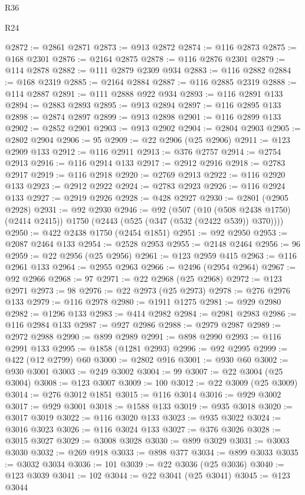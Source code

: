 \begin{lexlean}{R36}
\begin{lexlean}{R24}
\begin{coremodule}
{{{{{{{{{{{{{{{{{{{{{{{{{{{{{{{{{{{{{{{{{{{{{{{{{{{{{{{{{{{{{{{{{{{{{{{{{{{{{{{{{{{{{{{{{{{{{{{{{{{{{{{{{{{{{{{{{{{{{{{{{{{{{{{{{{{{{{{{{{{{{{{{{{{{{{{{{{{{{{{{{{{{{{{{{{{{{{{{{{{{{{{{{{{{{{{{{{{@2872 := @2861 @2871
@2873 := @913 @2872
@2874 := @116 @2873
@2875 := @168 @2301
@2876 := @2164 @2875
@2878 := @116 @2876 @2301
@2879 := @114 @2878
@2882 := @111 @2879 @2309 @934
@2883 := @116 @2882
@2884 := @168 @2319
@2885 := @2164 @2884
@2887 := @116 @2885 @2319
@2888 := @114 @2887
@2891 := @111 @2888 @922 @934
@2893 := @116 @2891 @133
@2894 := @2883 @2893
@2895 := @913 @2894
@2897 := @116 @2895 @133
@2898 := @2874 @2897
@2899 := @913 @2898
@2901 := @116 @2899 @133
@2902 := @2852 @2901
@2903 := @913 @2902
@2904 := @2804 @2903
@2905 := @2802 @2904
@2906 := 95
@2909 := @22 @2906 (@25 @2906)
@2911 := @123 @2909 @133
@2912 := @116 @2911
@2913 := @376 @2757
@2914 := @2754 @2913
@2916 := @116 @2914 @133
@2917 := @2912 @2916
@2918 := @2783 @2917
@2919 := @116 @2918
@2920 := @2769 @2913
@2922 := @116 @2920 @133
@2923 := @2912 @2922
@2924 := @2783 @2923
@2926 := @116 @2924 @133
@2927 := @2919 @2926
@2928 := @428 @2927
@2930 := @2801 (@2905 @2928)
@2931 := @92 @2930
@2946 := @92
    (@507
      (@10 (@508 @2438 @1750) (@2414 @2415))
      @1750
      (@2443 (@525 (@347 (@532 (@2422 @539)) @370))))
@2950 := @422 @2438 @1750 (@2454 @1851)
@2951 := @92 @2950
@2953 := @2087 @2464 @133
@2954 := @2528 @2953
@2955 := @2148 @2464
@2956 := 96
@2959 := @22 @2956 (@25 @2956)
@2961 := @123 @2959 @415
@2963 := @116 @2961 @133
@2964 := @2955 @2963
@2966 := @2496 (@2954 @2964)
@2967 := @92 @2966
@2968 := 97
@2971 := @22 @2968 (@25 @2968)
@2972 := @123 @2971
@2973 := 98
@2976 := @22 @2973 (@25 @2973)
@2978 := @276 @2976 @133
@2979 := @116 @2978
@2980 := @1911 @1275
@2981 := @929 @2980
@2982 := @1296 @133
@2983 := @414 @2982
@2984 := @2981 @2983
@2986 := @116 @2984 @133
@2987 := @927 @2986
@2988 := @2979 @2987
@2989 := @2972 @2988
@2990 := @899 @2989
@2991 := @898 @2990
@2993 := @116 @2991 @133
@2995 := @1858 (@1281 @2993)
@2996 := @92 @2995
@2999 := @422 (@12 @2799) @60
@3000 := @2802 @916
@3001 := @930 @60
@3002 := @930 @3001
@3003 := @249 @3002
@3004 := 99
@3007 := @22 @3004 (@25 @3004)
@3008 := @123 @3007
@3009 := 100
@3012 := @22 @3009 (@25 @3009)
@3014 := @276 @3012 @1851
@3015 := @116 @3014
@3016 := @929 @3002
@3017 := @929 @3001
@3018 := @1588 @133
@3019 := @935 @3018
@3020 := @3017 @3019
@3022 := @116 @3020 @133
@3023 := @935 @3022
@3024 := @3016 @3023
@3026 := @116 @3024 @133
@3027 := @376 @3026
@3028 := @3015 @3027
@3029 := @3008 @3028
@3030 := @899 @3029
@3031 := @3003 @3030
@3032 := @269 @918
@3033 := @898 @377
@3034 := @899 @3033
@3035 := @3032 @3034
@3036 := 101
@3039 := @22 @3036 (@25 @3036)
@3040 := @123 @3039
@3041 := 102
@3044 := @22 @3041 (@25 @3041)
@3045 := @123 @3044
}}}}}}}}}}}}}}}}}}}}}}}}}}}}}}}}}}}}}}}}}}}}}}}}}}}}}}}}}}}}}}}}}}}}}}}}}}}}}}}}}}}}}}}}}}}}}}}}}}}}}}}}}}}}}}}}}}}}}}}}}}}}}}}}}}}}}}}}}}}}}}}}}}}}}}}}}}}}}}}}}}}}}}}}}}}}}}}}}}}}}}}}}}}}}}}}}}}
\end{coremodule}
\end{lexlean}
\end{lexlean}
